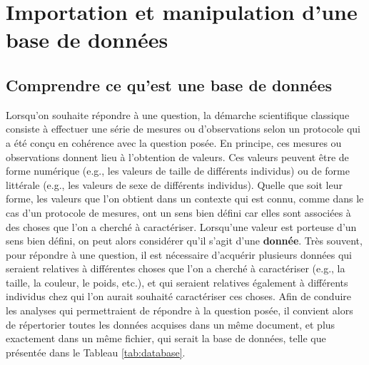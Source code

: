 \documentclass[
  french,
]{book}
\begin{document}
\hypertarget{importation-et-manipulation-dune-base-de-donnuxe9es}{%
\chapter{Importation et manipulation d'une base de données}\label{importation-et-manipulation-dune-base-de-donnuxe9es}}

\hypertarget{comprendre-ce-quest-une-base-de-donnuxe9es}{%
\section{Comprendre ce qu'est une base de données}\label{comprendre-ce-quest-une-base-de-donnuxe9es}}

Lorsqu'on souhaite répondre à une question, la démarche scientifique classique consiste à effectuer une série de mesures ou d'observations selon un protocole qui a été conçu en cohérence avec la question posée. En principe, ces mesures ou observations donnent lieu à l'obtention de valeurs. Ces valeurs peuvent être de forme numérique (e.g., les valeurs de taille de différents individus) ou de forme littérale (e.g., les valeurs de sexe de différents individus). Quelle que soit leur forme, les valeurs que l'on obtient dans un contexte qui est connu, comme dans le cas d'un protocole de mesures, ont un sens bien défini car elles sont associées à des choses que l'on a cherché à caractériser. Lorsqu'une valeur est porteuse d'un sens bien défini, on peut alors considérer qu'il s'agit d'une \textbf{donnée}.
Très souvent, pour répondre à une question, il est nécessaire d'acquérir plusieurs données qui seraient relatives à différentes choses que l'on a cherché à caractériser (e.g., la taille, la couleur, le poids, etc.), et qui seraient relatives également à différents individus chez qui l'on aurait souhaité caractériser ces choses. Afin de conduire les analyses qui permettraient de répondre à la question posée, il convient alors de répertorier toutes les données acquises dans un même document, et plus exactement dans un même fichier, qui serait la base de données, telle que présentée dans le Tableau \ref{tab:database}.

\providecommand{\docline}[3]{\noalign{\global\setlength{\arrayrulewidth}{#1}}\arrayrulecolor[HTML]{#2}\cline{#3}}

\setlength{\tabcolsep}{2pt}

\renewcommand*{\arraystretch}{1.5}
\end{document}
